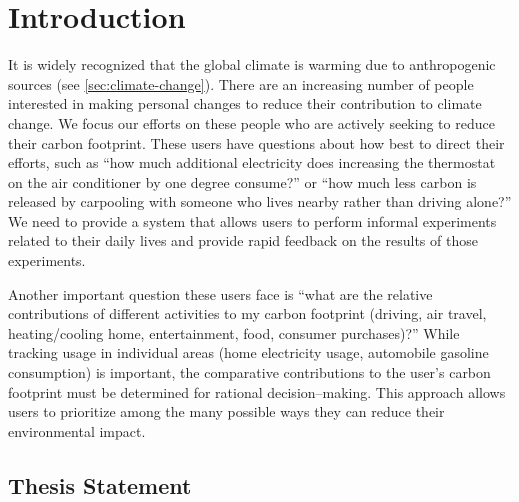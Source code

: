 \chapter{Introduction}

It is widely recognized that the global climate is warming due to anthropogenic sources (see \autoref{sec:climate-change}). There are an increasing number of people interested in making personal changes to reduce their contribution to climate change. We focus our efforts on these people who are actively seeking to reduce their carbon footprint. These users have questions about how best to direct their efforts, such as “how much additional electricity does increasing the thermostat on the air conditioner by one degree consume?” or “how much less carbon is released by carpooling with someone who lives nearby rather than driving alone?” We need to provide a system that allows users to perform informal experiments related to their daily lives and provide rapid feedback on the results of those experiments.

Another important question these users face is ``what are the relative contributions of different activities to my carbon footprint (driving, air travel, heating/cooling home, entertainment, food, consumer purchases)?'' While tracking usage in individual areas (home electricity usage, automobile gasoline consumption) is important, the comparative contributions to the user’s carbon footprint must be determined for rational decision–making. This approach allows users to prioritize among the many possible ways they can reduce their environmental impact.

\section{Thesis Statement}
